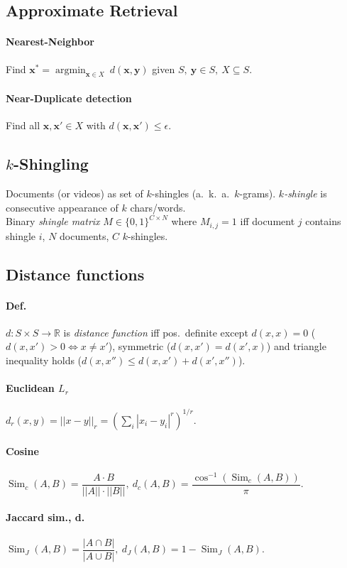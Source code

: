 \documentclass[10pt]{scrartcl}
\DeclareMathOperator{\argmin}{argmin}
\DeclareMathOperator{\Sim}{Sim}
\newcommand{\eps}{\epsilon}
\newcommand{\R}{\mathbb{R}}
\begin{document}
\begin{multicols}{3}

\section{Approximate Retrieval}
\paragraph{Nearest-Neighbor} Find $\bm x^* = \argmin_{\bm x \in X} \ d(\bm x,\bm y)$
given $S,\ \bm y \in S,\ X\subseteq S$.
\paragraph{Near-Duplicate detection}
Find all $\bm x, \bm x'\in X$ with $d(\bm x,\bm x') \leq \eps$.
\subsection{$k$-Shingling}
Documents (or videos) as set of $k$-shingles (a.\ k.\ a.\ $k$-grams).
\emph{$k$-shingle} is consecutive appearance of $k$ chars/words. \\
Binary \emph{shingle matrix} $M \in \{0,1\}^{C \times N}$ where $M_{i,j} = 1$ iff document $j$ contains shingle $i$, $N$ documents, $C$ $k$-shingles.
\subsection{Distance functions}
\paragraph{Def.}
$d: S \times S \rightarrow \R$ is \emph{distance function} iff pos.\ definite except $d(x,x) = 0$ ($d(x,x') > 0 \iff x \neq x'$), symmetric ($d(x,x') = d(x',x)$) and triangle inequality holds ($d(x,x'') \leq d(x,x') + d(x',x'')$).
\paragraph{Euclidean $L_r$}
$d_r(x,y) = ||x-y||_r = (\sum_i |x_i - y_i|^r)^{1/r}$.
\paragraph{Cosine}
$\Sim_c(A,B) = \dfrac{A \cdot B}{||A||\cdot||B||},\ d_c(A,B) = \dfrac{\cos^{-1}(\Sim_c(A,B))}{\pi}.$
\paragraph{Jaccard sim., d.}
$\Sim_J(A,B) = \dfrac{|A \cap B|}{|A \cup B|},\ d_J(A,B) = 1 - \Sim_J(A,B).$


\end{multicols}
\end{document}
